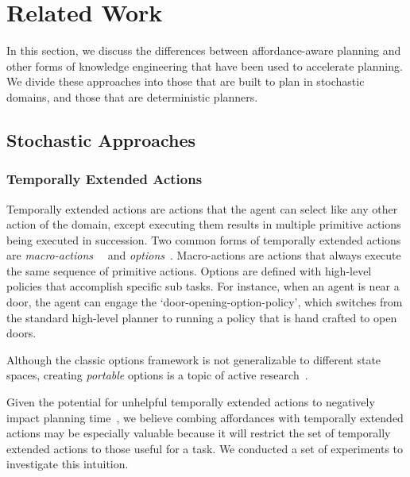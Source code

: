 \documentclass[conference]{IEEEtran}
\begin{document}
\section{Related Work}
\label{sec:related-work}

In this section, we discuss the differences between
affordance-aware planning and other forms of knowledge engineering that
have been used to accelerate planning. We divide these approaches
into those that are built to plan in stochastic domains, and those that are
deterministic planners.

\subsection{Stochastic Approaches}

\subsubsection{Temporally Extended Actions}
Temporally extended actions are actions that the agent can
select like any other action of the domain, except executing them
results in multiple primitive actions being executed in
succession. Two common forms of temporally extended actions are {\em
  macro-actions}~\cite{hauskrecht98} ~and {\em options}~\cite{sutton99}. 
Macro-actions are actions that always
execute the same sequence of primitive actions. Options are defined
with high-level policies that accomplish specific sub tasks. For
instance, when an agent is near a door, the agent can engage the
`door-opening-option-policy', which switches from the standard
high-level planner to running a policy that is hand crafted to open
doors. 

Although the classic options framework is not generalizable to different state spaces,
creating {\em portable} options is a topic of active research~\cite{konidaris07,konidaris2009efficient,Ravindran03analgebraic,croonenborghs2008learning,andre2002state,konidaris2012transfer}.

Given the potential for unhelpful temporally extended actions to negatively impact planning time~\cite{Jong:2008zr}, we believe combing affordances with temporally extended actions
may be especially valuable because it will restrict the set of temporally extended actions to those
useful for a task. We conducted a set of experiments to investigate this intuition.
\end{document}
